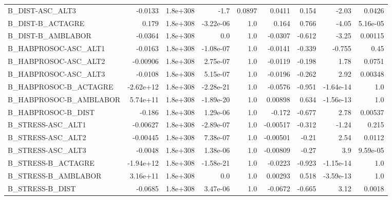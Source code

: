 \begin{tabular}{lrrrrrrrr}
B\_DIST-ASC\_ALT3               &     -0.0133 &     1.8e+308 &      -1.7 &   0.0897 &     0.0411 &       0.154 &        -2.03 &        0.0426 \\
B\_DIST-B\_ACTAGRE              &       0.179 &     1.8e+308 & -3.22e-06 &      1.0 &      0.164 &       0.766 &        -4.05 &      5.16e-05 \\
B\_DIST-B\_AMBLABOR             &     -0.0364 &     1.8e+308 &       0.0 &      1.0 &    -0.0307 &      -0.612 &        -3.25 &       0.00115 \\
B\_HABPROSOC-ASC\_ALT1          &     -0.0163 &     1.8e+308 & -1.08e-07 &      1.0 &    -0.0141 &      -0.339 &       -0.755 &          0.45 \\
B\_HABPROSOC-ASC\_ALT2          &    -0.00906 &     1.8e+308 &  2.75e-07 &      1.0 &    -0.0119 &      -0.198 &         1.78 &        0.0751 \\
B\_HABPROSOC-ASC\_ALT3          &     -0.0108 &     1.8e+308 &  5.15e-07 &      1.0 &    -0.0196 &      -0.262 &         2.92 &       0.00348 \\
B\_HABPROSOC-B\_ACTAGRE         &   -2.62e+12 &     1.8e+308 & -2.28e-21 &      1.0 &    -0.0576 &      -0.951 &    -1.64e-14 &           1.0 \\
B\_HABPROSOC-B\_AMBLABOR        &    5.74e+11 &     1.8e+308 & -1.89e-20 &      1.0 &    0.00898 &       0.634 &    -1.56e-13 &           1.0 \\
B\_HABPROSOC-B\_DIST            &      -0.186 &     1.8e+308 &  1.29e-06 &      1.0 &     -0.172 &      -0.677 &         2.78 &       0.00537 \\
B\_STRESS-ASC\_ALT1             &    -0.00627 &     1.8e+308 & -2.89e-07 &      1.0 &   -0.00517 &      -0.312 &        -1.24 &         0.215 \\
B\_STRESS-ASC\_ALT2             &    -0.00445 &     1.8e+308 &  7.38e-07 &      1.0 &   -0.00501 &       -0.21 &         2.54 &        0.0112 \\
B\_STRESS-ASC\_ALT3             &     -0.0048 &     1.8e+308 &  1.38e-06 &      1.0 &   -0.00809 &       -0.27 &          3.9 &      9.59e-05 \\
B\_STRESS-B\_ACTAGRE            &   -1.94e+12 &     1.8e+308 & -1.58e-21 &      1.0 &    -0.0223 &      -0.923 &    -1.15e-14 &           1.0 \\
B\_STRESS-B\_AMBLABOR           &    3.16e+11 &     1.8e+308 &       0.0 &      1.0 &    0.00293 &       0.518 &    -3.59e-13 &           1.0 \\
B\_STRESS-B\_DIST               &     -0.0685 &     1.8e+308 &  3.47e-06 &      1.0 &    -0.0672 &      -0.665 &         3.12 &        0.0018 \\

\end{tabular}

